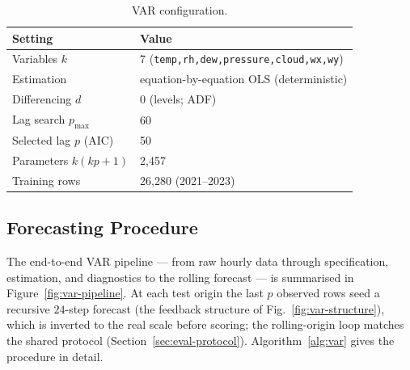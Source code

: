 \documentclass[12pt,a4paper,oneside]{report}
\begin{document}
\begin{table}[H]\centering
\caption{VAR configuration.}
\label{tab:var-config}
\begin{tabular}{ll}
\toprule
\textbf{Setting} & \textbf{Value} \\
\midrule
Variables $k$            & 7 (\texttt{temp,rh,dew,pressure,cloud,wx,wy}) \\
Estimation               & equation-by-equation OLS (deterministic) \\
Differencing $d$         & 0 (levels; ADF) \\
Lag search $p_{\max}$    & 60 \\
Selected lag $p$ (AIC)   & 50 \\
Parameters $k(kp{+}1)$   & 2{,}457 \\
Training rows            & 26{,}280 (2021--2023) \\
\bottomrule
\end{tabular}
\end{table}

\subsection{Forecasting Procedure}
\label{sec:var-predict}
The end-to-end VAR pipeline --- from raw hourly data through specification,
estimation, and diagnostics to the rolling forecast --- is summarised in
Figure~\ref{fig:var-pipeline}. At each test origin the last $p$ observed rows seed a
recursive $24$-step forecast (the feedback structure of Fig.~\ref{fig:var-structure}),
which is inverted to the real scale before scoring;
the rolling-origin loop matches the shared protocol
(Section~\ref{sec:eval-protocol}). Algorithm~\ref{alg:var} gives the procedure in
detail.
\end{document}
